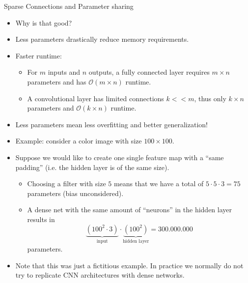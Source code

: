 \documentclass[11pt,compress,t,notes=noshow, xcolor=table]{beamer}
\begin{document}
\begin{vbframe}{Sparse Connections and Parameter sharing}
  \begin{itemize}
    \item Why is that good?
    \item Less parameters drastically reduce memory requirements.
    \item Faster runtime:
    \begin{itemize}
      \item For $m$ inputs and $n$ outputs, a fully connected layer requires $m\times n$ parameters and has $\mathcal{O}(m\times n)$ runtime.
      \item A convolutional layer has limited connections $k<<m$, thus only $k\times n$ parameters and $\mathcal{O}(k\times n)$ runtime.
    \end{itemize}
    \item Less parameters mean less overfitting and better generalization!
  \end{itemize}
\framebreak
  \begin{itemize}
    \item Example: consider a color image with size $100 \times 100$.
    \item Suppose we would like to create one single feature map with a \enquote{same padding} (i.e. the hidden layer is of the same size).
    \begin{itemize}
      \item Choosing a filter with size $5$ means that we have a total of $5 \cdot 5 \cdot 3 = 75$ parameters (bias unconsidered).
      \item A dense net with the same amount of \enquote{neurons} in the hidden layer results in 
      $$\underbrace{(100^2 \cdot 3)}_{\text{input}} \cdot \underbrace{(100^2)}_{\text{hidden layer}} = 300.000.000 $$ parameters.
      
      
    \end{itemize}
  \item Note that this was just a fictitious example. In practice we normally do not try to replicate CNN architectures with dense networks.
  \end{itemize}
\end{vbframe}
\end{document}
